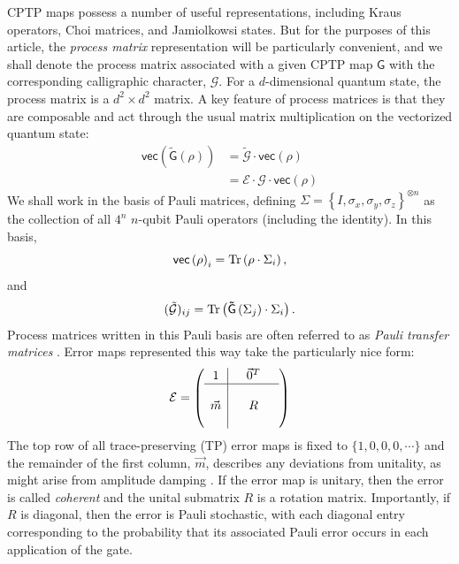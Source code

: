 \documentclass[aps,nofootinbib,pra,notitlepage,twocolumn]{revtex4-1}
\newcommand{\tr}{{\rm Tr\thinspace}}
\newcommand{\vectorize}[1]{\ensuremath{\mathsf{vec}\left(#1\right)}}
\begin{document}
CPTP maps possess a number of useful representations, including Kraus operators\cite{1983}, Choi matrices\cite{Choi1975}, and Jamiolkowsi states\cite{yczkowski2004}. But for the purposes of this article, the \emph{process matrix} representation will be particularly convenient\cite{OBrien2004}, and we shall denote the process matrix associated with a given CPTP map $\mathsf{G}$ with the corresponding calligraphic character, $\mathcal{G}$. For a $d$-dimensional quantum state, the process matrix is a $d^2\times d^2$ matrix. A key feature of process matrices is that they are composable and act through the usual matrix multiplication on the vectorized quantum state:
\begin{align}
	\vectorize{\mathsf{\tilde G}(\rho)}
		&= \mathcal{\tilde G}\cdot\vectorize{\rho} \\
		&= \mathcal{E}\cdot\mathcal{G}\cdot\vectorize{\rho}
\end{align}
We shall work in the basis of Pauli matrices, defining $\Sigma = \left\{I, \sigma_x, \sigma_y, \sigma_z\right\}^{\otimes n}$ as the collection of all $4^n$ $n$-qubit Pauli operators (including the identity).  In this basis,
\begin{equation}
  \vectorize{\rho}_i = \tr\!\left(\rho \cdot\Sigma_i\right),
\end{equation}
and
\begin{equation}
	(\mathcal{\tilde G})_{ij} = \tr\!\left(\mathsf{\tilde G}\left(\Sigma_j\right) \cdot\Sigma_i\right).
\end{equation}
Process matrices written in this Pauli basis are often referred to as \emph{Pauli transfer matrices} \cite{Chow2012}.  Error maps represented this way take the particularly nice form:
\begin{equation}\label{eq:process_matrix}
\mathcal{E} =
	\left(\begin{array}{c|cccc}
		1 &  & \vec{0}^T & \\ 
		\hline & &  &  \\
		\vec{m} &  & R &  \\
		 &  &  & 
	\end{array} 	
	\right)
\end{equation}
The top row of all trace-preserving (TP) error maps is fixed to $\{1,0,0,0,\cdots\}$ and the remainder of the first column, $\vec{m}$, describes any deviations from unitality, as might arise from amplitude damping \cite{preskill1997lecture}. If the error map is unitary, then the error is called \textit{coherent} and the unital submatrix $R$ is a rotation matrix.  Importantly, if $R$ is diagonal, then the error is Pauli stochastic, with each diagonal entry corresponding to the probability that its associated Pauli error occurs in each application of the gate. 
\end{document}
